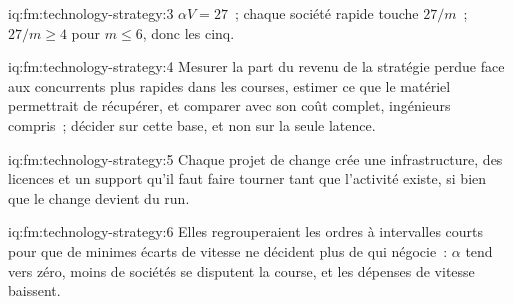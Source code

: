 \begin{solution}{iq:fm:technology-strategy:3}
$\alpha V=27$~; chaque société rapide touche $27/m$~; $27/m\ge4$ pour $m\le6$, donc les cinq.
\end{solution}

\begin{solution}{iq:fm:technology-strategy:4}
Mesurer la part du revenu de la stratégie perdue face aux concurrents plus rapides dans les courses, estimer ce que le matériel permettrait de récupérer, et comparer avec son coût complet, ingénieurs compris~; décider
sur cette base, et non sur la seule latence.
\end{solution}

\begin{solution}{iq:fm:technology-strategy:5}
Chaque projet de change crée une infrastructure, des licences et un support qu'il faut faire tourner tant que l'activité existe, si bien que le change devient du run.
\end{solution}

\begin{solution}{iq:fm:technology-strategy:6}
Elles regrouperaient les ordres à intervalles courts pour que de minimes écarts de vitesse ne décident plus de qui négocie~: $\alpha$ tend vers zéro, moins de sociétés
se disputent la course, et les dépenses de vitesse baissent.
\end{solution}
